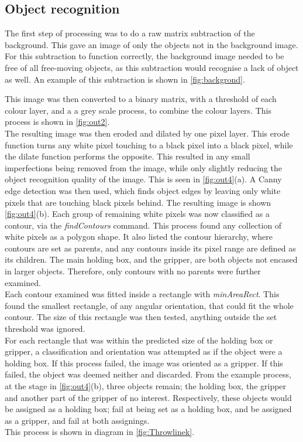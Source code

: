 \documentclass[11pt,a4paper, margin=1in]{report}
\begin{document}
\subsection{Object recognition}
The first step of processing was to do a raw matrix subtraction of the background. This gave an image of only the objects not in the background image. For this subtraction to function correctly, the background image needed to be free of all free-moving objects, as this subtraction would recognise a lack of object as well. An example of this subtraction is shown in \cref{fig:backgrond}.

This image was then converted to a binary matrix, with a threshold of each colour layer, and a a grey scale process, to combine the colour layers. This process is shown in \cref{fig:out2}.\\ 
The resulting image was then eroded and dilated by one pixel layer. This erode function turns any white pixel touching to a black pixel into a black pixel, while the dilate function performs the opposite. This resulted in any small imperfections being removed from the image, while only slightly reducing the object recognition quality of the image. This is seen in \cref{fig:out4}(a).
A Canny edge detection was then used, which finds object edges by leaving only white pixels that are touching black pixels behind. The resulting image is shown \cref{fig:out4}(b).
Each group of remaining white pixels was now classified as a contour, via the \textit{findContours} command. This process found any collection of white pixels as a polygon shape. It also listed the contour hierarchy, where contours are set as parents, and any contours inside its pixel range are defined as its children. The main holding box, and the gripper, are both objects not encased in larger objects. Therefore, only contours with no parents were further examined.\\
Each contour examined was fitted inside a rectangle with \textit{minAreaRect}. This found the smallest rectangle, of any angular orientation, that could fit the whole contour. The size of this rectangle was then tested, anything outside the set threshold was ignored.\\
For each rectangle that was within the predicted size of the holding box or gripper, a classification and orientation was attempted as if the object were a holding box. If this process failed, the image was oriented as a gripper. If this failed, the object was deemed neither and discarded. From the example process, at the stage in \cref{fig:out4}(b), three objects remain; the holding box, the gripper and another part of the gripper of no interest.  Respectively, these objects would be assigned as a holding box; fail at being set as a holding box, and be assigned as a gripper, and fail at both assignings.\\
This process is shown in diagram in \cref{fig:Throwlinek}.\\
\end{document}
